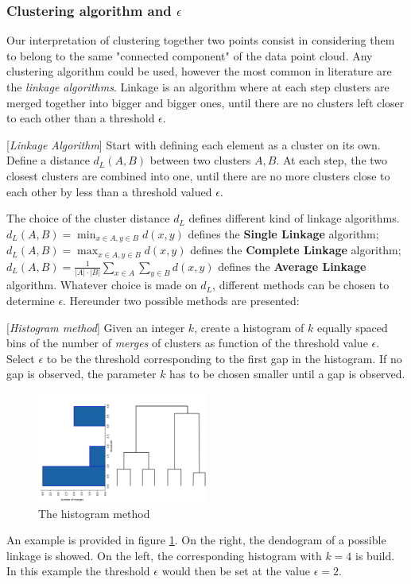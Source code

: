 \subsubsection{Clustering algorithm and $\epsilon$}
Our interpretation of clustering together two points consist in considering them to belong to the same "connected component" of the data point cloud. Any clustering algorithm could be used, however the most common in literature are the \textit{linkage algorithms}. Linkage is an algorithm where at each step clusters are merged together into bigger and bigger ones, until there are no clusters left closer to each other than a threshold $\epsilon$.
\begin{definition}{[\textit{Linkage Algorithm}]}
	Start with defining each element as a cluster on its own. Define a distance $d_L(A,B)$ between two clusters $A, B$. At each step, the two closest clusters are combined into one, until there are no more clusters close to each other by less than a threshold valued $\epsilon$.
\end{definition}
The choice of the cluster distance $d_L$ defines different kind of linkage algorithms. $d_L(A,B)=\min_{x\in A, y\in B}d(x,y)$ defines the \textbf{Single Linkage} algorithm; $d_L(A,B)=\max_{x\in A, y\in B}d(x,y)$ defines the \textbf{Complete Linkage} algorithm; $d_L(A,B)=\frac{1}{|A|\cdot|B|}\sum_{x\in A}\sum_{y\in B}d(x,y)$ defines the \textbf{Average Linkage} algorithm. Whatever choice is made on $d_L$, different methods can be chosen to determine $\epsilon$. Hereunder two possible methods are presented:
\begin{definition*}{[\textit{Histogram method}]}
	Given an integer $k$, create a histogram of $k$ equally spaced bins of the number of \textit{merges} of clusters as function of the threshold value $\epsilon$. Select $\epsilon$ to be the threshold corresponding to the first gap in the histogram. If no gap is observed, the parameter $k$ has to be chosen smaller until a gap is observed.
\end{definition*}
\begin{figure}[htbp!] 
	\centering    
	\includegraphics[width=0.5\textwidth]{histogram_method.png}
	\caption{The histogram method}
	\label{fig:histogram_method}
\end{figure}
An example is provided in figure \ref{fig:histogram_method}. On the right, the dendogram of a possible linkage is showed. On the left, the corresponding histogram with $k=4$ is build. In this example the threshold $\epsilon$ would then be set at the value $\epsilon=2$.

